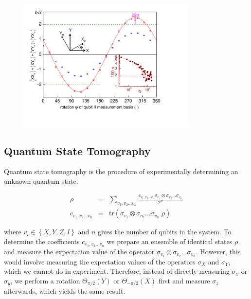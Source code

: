 \begin{figure}
	\centering
		\includegraphics[width=0.8\textwidth]{./material/papers/iswap/figures/chsh}
	\label{fig:CHSH}
	\caption{}
\end{figure}

\subsection{Quantum State Tomography}

Quantum state tomography is the procedure of experimentally determining an unknown quantum state\cite{michael_a._nielsen_quantum_2000}.

\begin{eqnarray}
\rho & = & \sum\limits_{v_1,v_2\hdots v_n} \frac{c_{v_1,v_2\hdots v_n} \sigma_{v_1}\otimes \sigma_{v_2}\hdots \sigma_{v_n}}{2^n} \label{eq:state_tomography_state_representation} \\
c_{v_1,v_2\hdots v_n} & = & \mathrm{tr}\left(\sigma_{v_1}\otimes \sigma_{v_2}\hdots \sigma_{v_n} \; \rho \right)  \label{eq:state_tomography_coefficients}
\end{eqnarray}

where $v_i \in \left\{ X,Y,Z,I\right\}$ and $n$ gives the number of qubits in the system. To determine the coefficients $c_{v_1,v_2\hdots v_n}$ we prepare an ensemble of identical states $\rho$ and measure the expectation value of the operator $\sigma_{v_1}\otimes \sigma_{v_2}\hdots \sigma_{v_n}$. However, this would involve measuring the expectation values of the operators $\sigma_{X}$ and $\sigma_{Y}$, which we cannot do in experiment. Therefore, instead of directly measuring $\sigma_x$ or $\sigma_y$, we perform a rotation $\Theta_{\pi /2}(Y)$ or $\Theta_{-\pi /2}(X)$ first and measure $\sigma_z$ afterwards, which yields the same result. 

